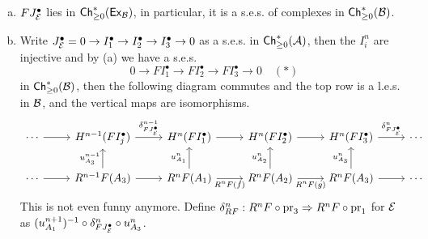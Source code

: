 \documentclass[a4paper]{report}
\begin{document}
\begin{lemm}
\begin{enumerate}[(a)]
  \item $F J_{\cal E}^{\bullet}$ lies in $\mathsf{Ch}^*_{\ge 0}(\mathsf{Ex}_{\mathcal{B}})$, in particular, it is a s.e.s. of complexes in $\mathsf{Ch}^*_{\ge 0}(\mathcal{B})$.
  \item Write $J_{\cal E}^{\bullet} = 0 \to I_{1}^{\bullet} \to I_{2}^{\bullet} \to I_{3}^{\bullet} \to 0$ as a s.e.s. in $\mathsf{Ch}^*_{\ge 0}(\mathcal{A})$, then the $I_{i}^{n}$ are injective and by (a) we have a s.e.s. \[0 \to FI_{1}^{\bullet} \to FI_{2}^{\bullet} \to FI_{3}^{\bullet} \to 0\quad (*)\]in $\mathsf{Ch}^*_{\ge 0}(\mathcal{B})$, then the following diagram commutes and the top row is a l.e.s. in $\mathcal{B}$, and the vertical maps are isomorphisms.
        \[\begin{tikzcd}
\cdots \arrow[r] & H^{n-1}(FI_j^\bullet) \arrow[r, "\delta_{FJ_{\cal E}^\bullet}^{n-1}"] & H^{n}(FI_1^\bullet) \arrow[r]                              & H^{n}(FI_2^\bullet) \arrow[r]                              & H^{n}(FI_3^\bullet) \arrow[r, "\delta_{FJ_{\cal E}^\bullet}^{n}"] & \cdots \\
\cdots \arrow[r] & R^{n-1}F(A_3) \arrow[r] \arrow[u, "u_{A_3}^{n-1}"]                    & R^{n}F(A_1) \arrow[r, "R^nF(f)"'] \arrow[u, "u_{A_1}^{n}"] & R^{n}F(A_2) \arrow[r, "R^nF(g)"'] \arrow[u, "u_{A_2}^{n}"] & R^{n}F(A_3) \arrow[r] \arrow[u, "u_{A_3}^{n}"]                    & \cdots
\end{tikzcd}\]
        This is not even funny anymore. Define $\delta_{RF}^{n}: R^{n}F\circ \operatorname{pr}_{3} \Rightarrow R^{n}F \circ \operatorname{pr}_{1}$ for $\cal E$ as $(u_{A_{1}}^{n+1})^{-1} \circ \delta_{FJ_{\cal E}^{\bullet}}^{n} \circ u^{n}_{A_{3}}$.
\end{enumerate}

\end{lemm}
\end{document}
